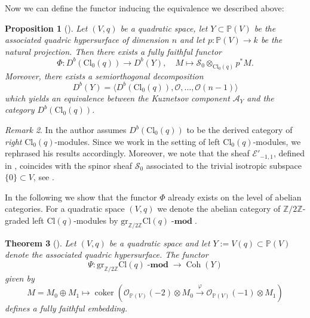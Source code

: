 \documentclass[a4paper, twoside, 11pt]{amsart}
\newtheorem{theorem}{Theorem}[section]
\newtheorem{proposition}[theorem]{Proposition}
\theoremstyle{definition}
\theoremstyle{remark}
\newtheorem{remark}[theorem]{Remark}
\numberwithin{equation}{theorem}
\DeclareMathOperator{\coker}{coker}
\DeclareMathOperator{\coh}{Coh}
\newcommand{\lmod}{{\operatorname{\mathbf{-mod}}}}
\newcommand{\evencl}{\mathrm{Cl}_0}
\newcommand{\cl}{\mathrm{Cl}}
\begin{document}
Now we can define the functor inducing the equivalence we described above: 
\begin{proposition}[{\cite[Theorem 4.2]{quadric_fibr}}]\label{Kuznetsov_ff_SOD}
    Let $(V,q)$ be a quadratic space, let $Y \subset \mathbb{P}(V)$ be the associated quadric hypersurface of dimension $n$ and let $p\colon \mathbb{P}(V) \to k$ be the natural projection. Then there exists a fully faithful functor
    \begin{equation}
        \Phi\colon D^b(\evencl(q)) \longrightarrow D^b(Y), \quad M \mapsto \mathcal{S}_0 \otimes_{\evencl(q)} p^*M.
    \end{equation}
    Moreover, there exists a semiorthogonal decomposition
    \begin{equation}
        D^b(Y) = \langle D^b(\evencl(q)), \mathcal{O},\dots,  \mathcal{O}(n-1) \rangle
    \end{equation}
    which yields an equivalence between the Kuznetsov component $\mathcal{A}_Y$ and the category $D^b(\evencl(q))$. 
\end{proposition}
\begin{remark}
    In \cite{quadric_fibr} the author assumes $D^b(\evencl(q))$ to be the derived category of \textit{right} $\evencl(q)$-modules. Since we work in the setting of left $\evencl(q)$-modules, we rephrased his results accordingly. Moreover, we note that the sheaf $\mathcal{E}'_{-1,1}$, defined in \cite[preceding Lemma 4.5]{quadric_fibr}, coincides with the spinor sheaf $\mathcal{S}_0$ associated to the trivial isotropic subspace $\{0\}\subset V$, see \cite[Lemma 4.7]{quadric_fibr}. 
\end{remark}
In the following we show that the functor $\Phi$ already exists on the level of abelian categories. For a quadratic space $(V,q)$ we denote the abelian category of $\mathbb{Z}/2\mathbb{Z}$-graded left $\cl(q)$-modules by $\mathrm{gr}_{\mathbb{Z}/2\mathbb{Z}}\cl(q)\lmod$.
\begin{theorem}[{\cite[§3]{Addington}}]\label{Addingtons_functor}
    Let $(V,q)$ be a quadratic space and let $Y := V(q) \subset \mathbb{P}(V)$ denote the associated quadric hypersurface. The functor 
    \begin{equation*}
    \Psi\colon  \mathrm{gr}_{\mathbb{Z}/2\mathbb{Z}}\cl(q)\lmod  \longrightarrow \coh(Y)
    \end{equation*}
    given by 
    \begin{equation*}
    M=M_0\oplus M_1  \mapsto \coker(\mathcal{O}_{\mathbb{P}(V)}(-2) \otimes M_0 \overset{\varphi}{\to} \mathcal{O}_{\mathbb{P}(V)}(-1) \otimes M_1)
    \end{equation*}
    defines a fully faithful embedding.
\end{theorem}
\end{document}
